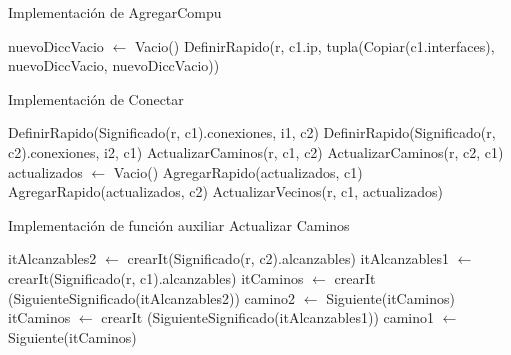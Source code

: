 \begin{Algoritmos}
\begin{algorithm}
\caption{Implementaci\'on de AgregarCompu}
\begin{algorithmic}[0]
	\State nuevoDiccVacio $\gets$ Vacio()  
	\State DefinirRapido(r, c1.ip, tupla(Copiar(c1.interfaces), nuevoDiccVacio, nuevoDiccVacio)) 
\EndFunction {}
\end{algorithmic}
\end{algorithm}

\begin{algorithm}
\caption{Implementaci\'on de Conectar}
\begin{algorithmic}[0]
\State DefinirRapido(Significado(r, c1).conexiones, i1, c2)
\State DefinirRapido(Significado(r, c2).conexiones, i2, c1)
\State ActualizarCaminos(r, c1, c2)
\State ActualizarCaminos(r, c2, c1)
\State actualizados $\gets$ Vacio() 
\State AgregarRapido(actualizados, c1)
\State AgregarRapido(actualizados, c2)
\State ActualizarVecinos(r, c1, actualizados)
\EndFunction
\end{algorithmic}
\end{algorithm}

\begin{algorithm}
\caption{Implementaci\'on de funci\'on auxiliar Actualizar Caminos}
\begin{algorithmic}[0]
\State itAlcanzables2 $\gets$ crearIt(Significado(r, c2).alcanzables)
	\State itAlcanzables1 $\gets$ crearIt(Significado(r, c1).alcanzables)
			\State itCaminos $\gets$ crearIt (SiguienteSignificado(itAlcanzables2))
			\State camino2 $\gets$ Siguiente(itCaminos) 
			\State itCaminos $\gets$ crearIt (SiguienteSignificado(itAlcanzables1))
			\State camino1 $\gets$ Siguiente(itCaminos) 
			

\end{algorithmic}
\end{algorithm}
\end{Algoritmos}
